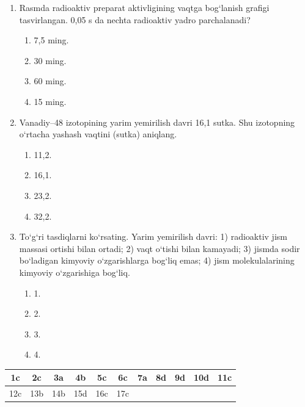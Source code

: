 \begin{enumerate}
\item Rasmda radioaktiv preparat aktivligining vaqtga bog‘lanish grafigi tasvirlangan. 0,05 s da nechta radioaktiv yadro parchalanadi?

\begin{center}
\end{center}

\begin{enumerate}[label=\Alph*)]
\item 7,5 ming.
\item 30 ming.
\item 60 ming.
\item 15 ming.
\end{enumerate}

\item Vanadiy--48 izotopining yarim yemirilish davri 16,1 sutka. Shu izotopning o‘rtacha yashash vaqtini (sutka) aniqlang.
\begin{enumerate}[label=\Alph*)]
\item 11,2.
\item 16,1.
\item 23,2.
\item 32,2.
\end{enumerate}

\item To‘g‘ri tasdiqlarni ko‘rsating. Yarim yemirilish davri:
1) radioaktiv jism massasi ortishi bilan ortadi;
2) vaqt o‘tishi bilan kamayadi;
3) jismda sodir bo‘ladigan kimyoviy o‘zgarishlarga bog‘liq emas;
4) jism molekulalarining kimyoviy o‘zgarishiga bog‘liq.
\begin{enumerate}[label=\Alph*)]
\item 1.
\item 2.
\item 3.
\item 4.
\end{enumerate}

\end{enumerate}







\begin{table}[!ht]
\centering
\begin{tabular}{|c|c|c|c|c|c|c|c|c|c|c|}
\hline
1c & 2c & 3a & 4b & 5c & 6c & 7a & 8d & 9d & 10d & 11c \\ \hline
12c & 13b & 14b & 15d & 16c & 17c & & & & & \\ \hline
\end{tabular}
\end{table}